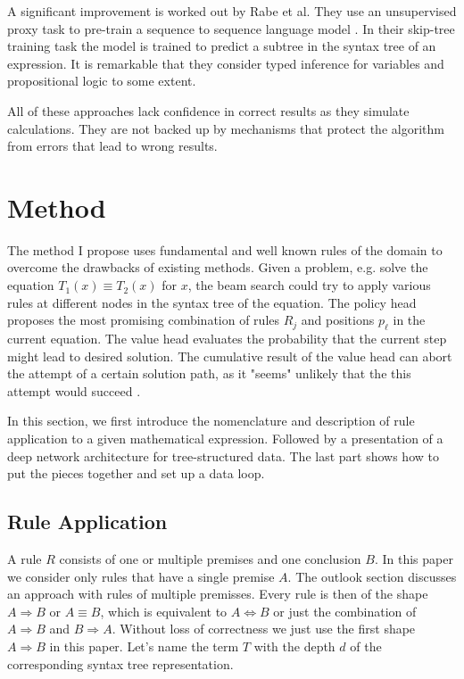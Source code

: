 \documentclass{scrartcl}
\theoremstyle{definition}
\begin{document}
A significant improvement is worked out by Rabe et al. They use an unsupervised proxy task to pre-train a sequence to sequence language model \cite{rabe2020mathematical}.
In their skip-tree training task the model is trained to predict a subtree in the syntax tree of an expression.
It is remarkable that they consider typed inference for variables and propositional logic to some extent.

All of these approaches lack confidence in correct results as they simulate calculations.
They are not backed up by mechanisms that protect the algorithm from errors that lead to wrong results.

\section{Method}

The method I propose uses fundamental and well known rules of the domain to overcome the drawbacks of existing methods.
Given a problem, e.g. solve the equation $T_1\left(x\right)\equiv T_2\left(x\right)$ for $x$,
the beam search could try to apply various rules at different nodes in the syntax tree of the equation.
The policy head proposes the most promising combination of rules $R_j$ and positions $p_\ell$ in the current equation.
The value head evaluates the probability that the current step might lead to desired solution.
The cumulative result of the value head can abort the attempt of a certain solution path, as it "seems" unlikely that the this attempt would succeed \cite{44806}.

In this section, we first introduce the nomenclature and description of rule application to a given mathematical expression.
Followed by a presentation of a deep network architecture for tree-structured data.
The last part shows how to put the pieces together and set up a data loop.

\subsection{Rule Application}

A rule $R$ consists of one or multiple premises and one conclusion $B$.
In this paper we consider only rules that have a single premise $A$.
The outlook section discusses an approach with rules of multiple premisses. 
Every rule is then of the shape $A \Longrightarrow B$ or $A \equiv B$, which is equivalent to $A \Longleftrightarrow B$ or just the combination of $A \Longrightarrow B$ and $B \Longrightarrow A$.
Without loss of correctness we just use the first shape $A \Longrightarrow B$ in this paper.
Let's name the term $T$ with the depth $d$ of the corresponding syntax tree representation.
\end{document}
